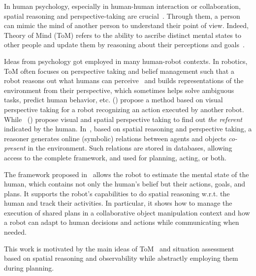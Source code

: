 \documentclass[letterpaper]{article} %
\begin{document}
In human psychology, especially in human-human interaction or collaboration, spatial reasoning and perspective-taking are crucial~\cite{flavell1992perspectives,tversky1999speakers}. Through them, a person can mimic the mind of another person to understand their point of view. Indeed, Theory of Mind (ToM) refers to the ability to ascribe distinct mental states to other people and update them by reasoning about their perceptions and goals~\cite{premack1978does,baron1985does}.

Ideas from psychology got employed in many human-robot contexts. In
robotics, ToM often
focuses on perspective taking and belief management such that a robot reasons out what humans can perceive~\cite{berlin2006perspective,milliez2014framework} and builds representations of the environment from their perspective, which sometimes helps solve ambiguous tasks, predict human behavior, etc.
\citeauthor{johnson2005perceptual} (\citeyear{johnson2005perceptual}) propose a method based on visual perspective taking for a robot recognizing an action executed by another robot. 
While~\citeauthor{milliez2014framework} (\citeyear{milliez2014framework}) propose visual and spatial perspective taking to find out {\em the referent} indicated by the human. 
In~\cite{Sisbot2011SituationAF}, based on spatial reasoning and perspective taking, a reasoner generates online (symbolic) relations between agents and objects {\em co-present} in the environment. 
Such relations are stored in databases, allowing access to the complete framework, and used for planning, acting, or both.

The framework proposed in~\cite{devin2016implemented} allows the robot to estimate the mental state of the human, which contains not only the human's belief but their actions, goals, and plans. It supports the robot's capabilities to do spatial reasoning w.r.t. the human and track their activities. In particular, it shows how to manage the execution of shared plans in a collaborative object manipulation context and how a robot can adapt to human decisions and actions while communicating when needed.

This work is motivated by the main ideas of ToM~\cite{devin2016implemented} and situation assessment based on spatial reasoning and observability while abstractly employing them during planning. 
\end{document}
